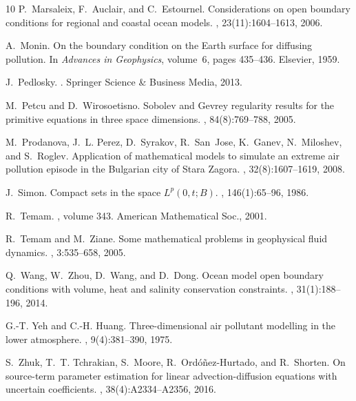 \documentclass[11pt]{article}
\begin{document}
\begin{thebibliography}{10}
P.~Marsaleix, F.~Auclair, and C.~Estournel.
\newblock Considerations on open boundary conditions for regional and coastal ocean models.
, 23(11):1604--1613, 2006.

A.~Monin.
\newblock On the boundary condition on the Earth surface for diffusing pollution.
\newblock In {\em Advances in Geophysics}, volume~6, pages 435--436. Elsevier, 1959.

J.~Pedlosky.
.
\newblock Springer Science \& Business Media, 2013.

M.~Petcu and D.~Wirosoetisno.
\newblock Sobolev and Gevrey regularity results for the primitive equations in three space dimensions.
, 84(8):769--788, 2005.

M.~Prodanova, J.~L. Perez, D.~Syrakov, R.~San~Jose, K.~Ganev, N.~Miloshev, and S.~Roglev.
\newblock Application of mathematical models to simulate an extreme air pollution episode in the Bulgarian city of Stara Zagora.
, 32(8):1607--1619, 2008.

J.~Simon.
\newblock Compact sets in the space $L^p(0, t; B)$.
, 146(1):65--96, 1986.

R.~Temam.
, volume 343.
\newblock American Mathematical Soc., 2001.

R.~Temam and M.~Ziane.
\newblock Some mathematical problems in geophysical fluid dynamics.
, 3:535--658, 2005.

Q.~Wang, W.~Zhou, D.~Wang, and D.~Dong.
\newblock Ocean model open boundary conditions with volume, heat and salinity conservation constraints.
, 31(1):188--196, 2014.

G.-T. Yeh and C.-H. Huang.
\newblock Three-dimensional air pollutant modelling in the lower atmosphere.
, 9(4):381--390, 1975.

S.~Zhuk, T.~T. Tchrakian, S.~Moore, R.~Ord{\'o}{\~n}ez-Hurtado, and R.~Shorten.
\newblock On source-term parameter estimation for linear advection-diffusion equations with uncertain coefficients.
, 38(4):A2334--A2356, 2016.

\end{thebibliography}
\end{document}
